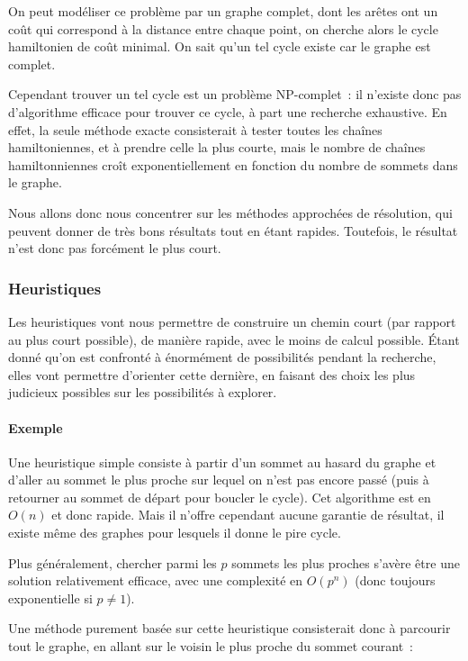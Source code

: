     On peut modéliser ce problème par un graphe complet, dont les arêtes ont un
    coût qui correspond à la distance entre chaque point, on cherche alors le
    cycle hamiltonien de coût minimal. On sait qu'un tel cycle existe car le
    graphe est complet.

    Cependant trouver un tel cycle est un problème NP-complet~: il n'existe
    donc pas d'algorithme efficace pour trouver ce cycle, à part une recherche
    exhaustive.
    En effet, la seule méthode exacte consisterait à tester toutes les chaînes
    hamiltoniennes, et à prendre celle la plus courte, mais le nombre de chaînes
    hamiltonniennes croît exponentiellement en fonction du nombre de sommets
    dans le graphe.

    Nous allons donc nous concentrer sur les méthodes approchées de résolution,
    qui peuvent donner de très bons résultats tout en étant rapides.
    Toutefois, le résultat n'est donc pas forcément le plus court.

  \subsubsection{Heuristiques}
    Les heuristiques vont nous permettre de construire un chemin court (par
    rapport au plus court possible), de manière rapide, avec le moins de calcul
    possible.  Étant donné qu'on est confronté à énormément de possibilités
    pendant la recherche, elles vont permettre d'orienter cette dernière, en
    faisant des choix les plus judicieux possibles sur les possibilités à
    explorer.

    \paragraph{Exemple} Une heuristique simple consiste à partir d'un sommet au
    hasard du graphe et d'aller au sommet le plus proche sur lequel on n'est
    pas encore passé (puis à retourner au sommet de départ pour boucler le
    cycle). Cet algorithme est en $O(n)$ et donc rapide. Mais il n'offre
    cependant aucune garantie de résultat, il existe même des graphes pour
    lesquels il donne le pire cycle.

    Plus généralement, chercher parmi les $p$ sommets les plus proches s'avère
    être une solution relativement efficace, avec une complexité en $O(p^n)$
    (donc toujours exponentielle si $p \neq 1$).

    Une méthode purement basée sur cette heuristique consisterait donc à parcourir
    tout le graphe, en allant sur le voisin le plus proche du sommet courant~:

